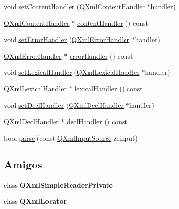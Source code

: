 \begin{DoxyCompactItemize}
\item 
void \hyperlink{class_q_xml_simple_reader_aa2333babd850e0de7acb8dc289189a0d}{set\-Content\-Handler} (\hyperlink{class_q_xml_content_handler}{Q\-Xml\-Content\-Handler} $\ast$handler)
\item 
\hyperlink{class_q_xml_content_handler}{Q\-Xml\-Content\-Handler} $\ast$ \hyperlink{class_q_xml_simple_reader_a1a4e5ad7bf70e67903b2a945f8072483}{content\-Handler} () const 
\item 
void \hyperlink{class_q_xml_simple_reader_ab7eeabc78e1b5441de9a97cd3c913889}{set\-Error\-Handler} (\hyperlink{class_q_xml_error_handler}{Q\-Xml\-Error\-Handler} $\ast$handler)
\item 
\hyperlink{class_q_xml_error_handler}{Q\-Xml\-Error\-Handler} $\ast$ \hyperlink{class_q_xml_simple_reader_a0b654ec23970213bf82c3d25c34589e4}{error\-Handler} () const 
\item 
void \hyperlink{class_q_xml_simple_reader_a74193ba46d809a87c8fa3fdf62469724}{set\-Lexical\-Handler} (\hyperlink{class_q_xml_lexical_handler}{Q\-Xml\-Lexical\-Handler} $\ast$handler)
\item 
\hyperlink{class_q_xml_lexical_handler}{Q\-Xml\-Lexical\-Handler} $\ast$ \hyperlink{class_q_xml_simple_reader_a64060ca6c8efeae151acfcbea11f8363}{lexical\-Handler} () const 
\item 
void \hyperlink{class_q_xml_simple_reader_a3e0950620f2689274c02e0e2e2e53a58}{set\-Decl\-Handler} (\hyperlink{class_q_xml_decl_handler}{Q\-Xml\-Decl\-Handler} $\ast$handler)
\item 
\hyperlink{class_q_xml_decl_handler}{Q\-Xml\-Decl\-Handler} $\ast$ \hyperlink{class_q_xml_simple_reader_af238cbc46d5cd865a8ac58a865a9b031}{decl\-Handler} () const 
\item 
bool \hyperlink{class_q_xml_simple_reader_a53d7ec4f8fd6f4576a7d6178b2c1c564}{parse} (const \hyperlink{class_q_xml_input_source}{Q\-Xml\-Input\-Source} \&input)
\end{DoxyCompactItemize}
\subsection*{Amigos}
\begin{DoxyCompactItemize}
\item 
\hypertarget{class_q_xml_simple_reader_a2ff4a58652c4931df003d69975caa9f2}{class {\bfseries Q\-Xml\-Simple\-Reader\-Private}}\label{class_q_xml_simple_reader_a2ff4a58652c4931df003d69975caa9f2}

\item 
\hypertarget{class_q_xml_simple_reader_a719c6d0688866ca5c61250f04fc80ca9}{class {\bfseries Q\-Xml\-Locator}}\label{class_q_xml_simple_reader_a719c6d0688866ca5c61250f04fc80ca9}

\end{DoxyCompactItemize}


